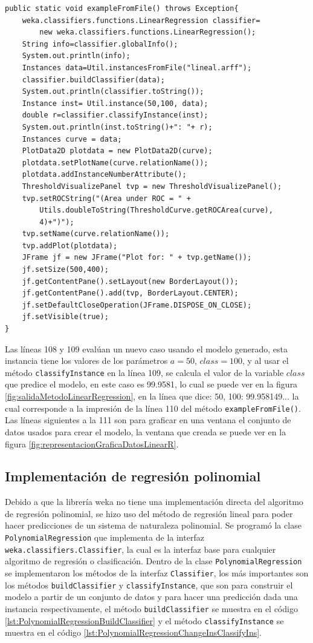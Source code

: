 \begin{lstlisting}[frame=single]  
public static void exampleFromFile() throws Exception{
	weka.classifiers.functions.LinearRegression classifier= 
		new weka.classifiers.functions.LinearRegression();
	String info=classifier.globalInfo();
	System.out.println(info);
	Instances data=Util.instancesFromFile("lineal.arff");	
	classifier.buildClassifier(data);
	System.out.println(classifier.toString());
	Instance inst= Util.instance(50,100, data);		
	double r=classifier.classifyInstance(inst);
	System.out.println(inst.toString()+": "+ r);		
	Instances curve = data;
	PlotData2D plotdata = new PlotData2D(curve);
	plotdata.setPlotName(curve.relationName());
	plotdata.addInstanceNumberAttribute();
	ThresholdVisualizePanel tvp = new ThresholdVisualizePanel();
	tvp.setROCString("(Area under ROC = " +
		Utils.doubleToString(ThresholdCurve.getROCArea(curve),
		4)+")");
	tvp.setName(curve.relationName());
	tvp.addPlot(plotdata);	
	JFrame jf = new JFrame("Plot for: " + tvp.getName());
	jf.setSize(500,400);
	jf.getContentPane().setLayout(new BorderLayout());
	jf.getContentPane().add(tvp, BorderLayout.CENTER);
	jf.setDefaultCloseOperation(JFrame.DISPOSE_ON_CLOSE);
	jf.setVisible(true);
}
\end{lstlisting}
Las líneas 108 y 109 evalúan un nuevo caso usando el modelo generado, esta instancia tiene los valores de los parámetros $a=50$, $class=100$, y al usar el método \texttt{classifyInstance} en la línea 109, se calcula el valor de la variable $class$ que predice el modelo, en este caso es 99.9581, lo cual se puede ver en la figura \ref{fig:salidaMetodoLinearRegression}, en la línea que dice: 50, 100: 99.958149... la cual corresponde a la impresión de la línea 110 del método \texttt{exampleFromFile()}.
Las líneas siguientes a la 111 son para graficar en una ventana el conjunto de datos usados para crear el modelo, la ventana que creada se puede ver en la figura \ref{fig:representacionGraficaDatosLinearR}.

\subsection{Implementación de regresión polinomial} \label{subsec:implementacionRegresionPolinomial}
Debido a que la librería weka no tiene una implementación directa del algoritmo de regresión polinomial, se hizo uso del método de regresión lineal para poder hacer predicciones de un sistema de naturaleza polinomial. 
Se programó la clase \texttt{PolynomialRegression} que implementa de la interfaz \texttt{weka.classifiers.Classifier}, la cual es la interfaz base para cualquier algoritmo de regresión o clasificación.
Dentro de la clase \texttt{PolynomialRegression} se implementaron los métodos de la interfaz \texttt{Classifier}, los más importantes son los métodos \texttt{buildClassifier} y \texttt{classifyInstance}, que son para construir el modelo a partir de un conjunto de datos y para hacer una predicción dada una instancia respectivamente, 
el método \texttt{buildClassifier} se muestra en el código \ref{lst:PolynomialRegressionBuildClassifier} 
y el método \texttt{classifyInstance} se muestra en el código \ref{lst:PolynomialRegressionChangeInsClassifyIns}.

